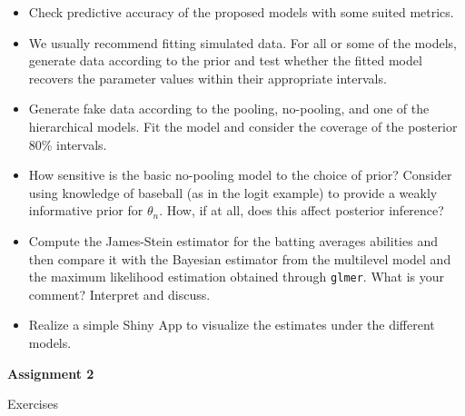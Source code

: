 \begin{itemize}
\item Check predictive accuracy of the proposed models with some suited metrics.
\item We usually recommend fitting simulated data. For all or some of the models, generate data according to the prior and test whether the fitted model recovers the parameter values within their appropriate intervals.
\item Generate fake data according to the pooling, no-pooling, and one of the hierarchical models. Fit the model and consider the coverage of the posterior 80\% intervals.
\item How sensitive is the basic no-pooling model to the choice of prior? Consider using knowledge of baseball (as in the logit example) to provide a weakly informative prior for $\theta_n$. How, if at all, does this affect posterior inference?
\item Compute the James-Stein estimator for the batting averages abilities and then compare it with the Bayesian estimator from the multilevel model and the maximum likelihood estimation obtained through \texttt{glmer}. What is your comment? Interpret and discuss.
\item Realize a simple Shiny App to visualize the estimates under the different models. 
\end{itemize}


\hspace{-0.8cm}
\textbf{Assignment 2}
\vspace{0.5cm}

Exercises 








